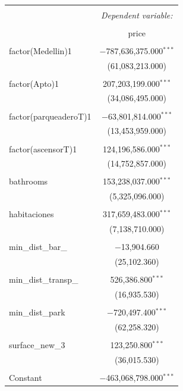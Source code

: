 \documentclass[conference, 10pt]{IEEEtran}
\begin{document}
\begin{table}[!htbp] \centering 
  \caption{} 
  \label{} 
\begin{tabular}{@{\extracolsep{5pt}}lc} 
\\[-1.8ex]\hline 
\hline \\[-1.8ex] 
 & \multicolumn{1}{c}{\textit{Dependent variable:}} \\ 
\cline{2-2} 
\\[-1.8ex] & price \\ 
\hline \\[-1.8ex] 
 factor(Medellin)1 & $-$787,636,375.000$^{***}$ \\ 
  & (61,083,213.000) \\ 
  & \\ 
 factor(Apto)1 & 207,203,199.000$^{***}$ \\ 
  & (34,086,495.000) \\ 
  & \\ 
 factor(parqueaderoT)1 & $-$63,801,814.000$^{***}$ \\ 
  & (13,453,959.000) \\ 
  & \\ 
 factor(ascensorT)1 & 124,196,586.000$^{***}$ \\ 
  & (14,752,857.000) \\ 
  & \\ 
 bathrooms & 153,238,037.000$^{***}$ \\ 
  & (5,325,096.000) \\ 
  & \\ 
 habitaciones & 317,659,483.000$^{***}$ \\ 
  & (7,138,710.000) \\ 
  & \\ 
 min\_dist\_bar\_ & $-$13,904.660 \\ 
  & (25,102.360) \\ 
  & \\ 
 min\_dist\_transp\_ & 526,386.800$^{***}$ \\ 
  & (16,935.530) \\ 
  & \\ 
 min\_dist\_park & $-$720,497.400$^{***}$ \\ 
  & (62,258.320) \\ 
  & \\ 
 surface\_new\_3 & 123,250.800$^{***}$ \\ 
  & (36,015.530) \\ 
  & \\ 
 Constant & $-$463,068,798.000$^{***}$ \\ 

\end{tabular}
\end{table}
\end{document}
